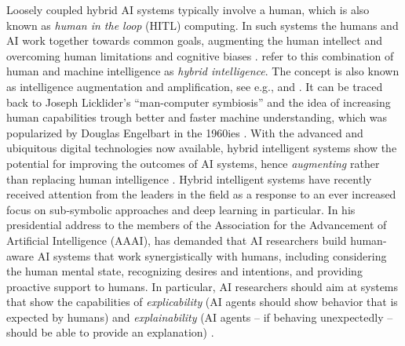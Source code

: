 Loosely coupled hybrid AI systems typically involve a human, which is also known as \textit{human in the loop} (HITL)
computing. In such systems the humans and AI work together towards common goals, augmenting the human intellect and
overcoming human limitations and cognitive biases \citep{akataResearchAgendaHybrid2020}. \cite{akataResearchAgendaHybrid2020}
refer to this combination of human and machine intelligence as \textit{hybrid intelligence}. The concept is also known as
intelligence augmentation and amplification, see e.g., \cite{schmidtAugmentingHumanIntellect2017} and
\cite{zhouIntelligenceAugmentationBuilding2021}. It can be traced back to Joseph Licklider's ``man-computer symbiosis'' and the
idea of increasing human capabilities trough better and faster machine understanding, which was popularized by Douglas Engelbart
in the 1960ies \citep[and references cited therein]{schmidtAugmentingHumanIntellect2017}. With the advanced and ubiquitous
digital technologies now available, hybrid intelligent systems show the potential for improving the outcomes of AI systems, 
hence \textit{augmenting} rather than replacing human intelligence \citep{schmidtAugmentingHumanIntellect2017,akataResearchAgendaHybrid2020}.
Hybrid intelligent systems have recently received attention from the leaders in the field as a response to an ever increased
focus on sub-symbolic approaches and deep learning in particular. In his presidential address to the members of the Association
for the Advancement of Artificial Intelligence (AAAI), \cite{kambhampatiChallengesHumanAwareAI2020} has demanded that AI
researchers build human-aware AI systems that work synergistically with humans, including considering the human mental state,
recognizing desires and intentions, and providing proactive support to humans. In particular, AI researchers should aim
at systems that show the capabilities of \textit{explicability} (AI agents should show behavior that is expected by
humans) and \textit{explainability} (AI agents -- if behaving unexpectedly -- should be able to provide an explanation)
\citep{kambhampatiChallengesHumanAwareAI2020}.

